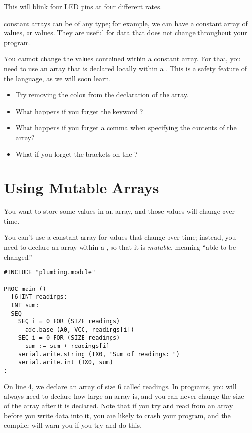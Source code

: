 This will blink four LED pins at four different rates.

\discussion

\occam constant arrays can be of any type; for example, we can have a constant array of \BOOL values, or \REALTT values. They are useful for data that does not change throughout your program. 

You cannot change the values contained within a constant array. For that, you need to use an array that is declared locally within a \PROC. This is a safety feature of the language, as we will soon learn.

\makingthingsbreak

\begin{itemize}
	\item Try removing the colon from the declaration of the array.
	\item What happens if you forget the keyword \VAL?
	\item What happens if you forget a comma when specifying the contents of the array?
	\item What if you forget the brackets on the {\code []\INT}?
\end{itemize}

\seealso

\XXX

% 
\section{Using Mutable Arrays}
\problem
You want to store some values in an array, and those values will change over time.

\solution
You can't use a constant array for values that change over time; instead, you need to declare an array within a \PROC, so that it is \emph{mutable}, meaning ``able to be changed.''

\begin{lstlisting}
#INCLUDE "plumbing.module"

PROC main ()
  [6]INT readings:
  INT sum:
  SEQ
    SEQ i = 0 FOR (SIZE readings)
      adc.base (A0, VCC, readings[i])
    SEQ i = 0 FOR (SIZE readings)
      sum := sum + readings[i]
    serial.write.string (TX0, "Sum of readings: ")
    serial.write.int (TX0, sum)
:
\end{lstlisting}

\discussion
On line 4, we declare an array of size 6 called {\code readings}. In \occam programs, you will always need to declare how large an array is, and you can never change the size of the array after it is declared. Note that if you try and read from an array before you write data into it, you are likely to crash your \occam program, and the compiler will warn you if you try and do this.

